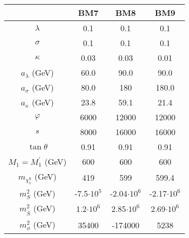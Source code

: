 \documentclass[12pt,a4paper]{article}
\begin{document}
\begin{table}\noindent \begin{tabular}{| c || c | c | c |}
\hline
                                  &    BM7                 &  BM8         &     BM9                 \\
\hline
$\lambda$                         &    0.1              & 	0.1                 & 	0.1                                 \\
$\sigma$                          &    0.1              & 	0.1                 & 	0.1                                 \\
$\kappa$                          &    0.03             & 	0.03                & 	0.01                                \\
$a_{\lambda}$ (GeV) 	          &    60.0             & 	90.0                & 	90.0                                \\
$a_{\sigma}$ (GeV) 	          &    80.0             & 	180                  & 	180.0                      \\
$a_{\kappa}$ (GeV) 	          &    23.8             & 	59.1                 & 	21.4                       \\
$\varphi$                         &    6000             & 	12000               & 	12000                                \\
$s$                   	         &     8000             & 	16000               & 	16000                                \\
$\tan\theta$                     &      0.91            & 	0.91                & 	0.91                                  \\
$M_1 = M_1^\prime$ (GeV) 	         &     600             & 	600                  & 	600                                                   \\
$m_{\chi_1^0}$ (GeV)                &     419              & 	599                    & 	599.4                                    \\
$m_S^2$ (GeV)                     &    -7.5$\cdot 10^5$          & 	-2.04$\cdot 10^6$            & 	-2.17$\cdot 10^6$                             \\
$m_{\overline{S}}^2$ (GeV)            &    1.2$\cdot 10^6$          & 	2.85$\cdot 10^6$              & 	2.69$\cdot 10^6$                                 \\
$m_\phi^2$ (GeV)                   &    35400             & 	-174000               & 	5238                                   \\

\end{tabular}
\end{table}
\end{document}

